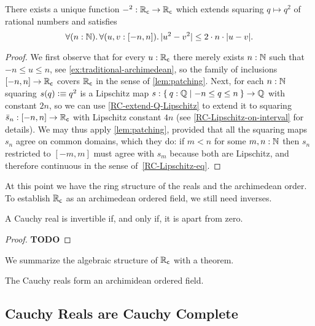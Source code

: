 \begin{thm} \label{RC-squaring}
  There exists a unique function ${-}^2 : \mathbb{R}_\mathsf{c} \to \mathbb{R}_\mathsf{c}$ which extends squaring $q \mapsto
  q^2$ of rational numbers and satisfies
  \begin{equation*}
    \fall{n : \N}
    \fall{u, v : [-n, n]}
    |u^2 - v^2| \leq 2 \cdot n \cdot |u - v|.
  \end{equation*}
\end{thm}

\begin{proof}
  We first observe that for every $u : \mathbb{R}_\mathsf{c}$ there merely exists $n : \mathbb{N}$ such that $-n
  \leq u \leq n$, see \autoref{ex:traditional-archimedean}, so the family of inclusions
  $[-n, n] \to \mathbb{R}_\mathsf{c}$ covers $\mathbb{R}_\mathsf{c}$ in the sense of \autoref{lem:patching}. Next, for each $n
  : \mathbb{N}$ squaring $s(q) \vcentcolon\equiv q^2$ is a Lipschitz map $s : \setof{ q : \Q | -n \leq q \leq
    n } \to \Q$ with constant $2 n$, so we can use \autoref{RC-extend-Q-Lipschitz} to
  extend it to squaring $\bar{s}_n : [-n, n] \to \mathbb{R}_\mathsf{c}$ with Lipschitz constant $4 n$ (see
  \autoref{RC-Lipschitz-on-interval} for details). We may thus apply
  \autoref{lem:patching}, provided that all the squaring maps $s_n$ agree on common
  domains, which they do: if $m < n$ for some $m, n : \mathbb{N}$ then $s_n$ restricted to $[-m,
  m]$ must agree with $s_m$ because both are Lipschitz, and therefore continuous in the
  sense of~\autoref{RC-Lipschitz-eq}.
\end{proof}

At this point we have the ring structure of the reals and the archimedean order. To
establish $\mathbb{R}_\mathsf{c}$ as an archimedean ordered field, we still need inverses.

\begin{thm}
  A Cauchy real is invertible if, and only if, it is apart from zero.
\end{thm}

\begin{proof}
  \textbf{TODO}
\end{proof}

We summarize the algebraic structure of $\mathbb{R}_\mathsf{c}$ with a theorem.

\begin{thm} \label{RC-archimedean-ordered-field}
  The Cauchy reals form an archimidean ordered field.
\end{thm}

\subsection{Cauchy Reals are Cauchy Complete}
\label{sec:cauchy-reals-cauchy-complete}

